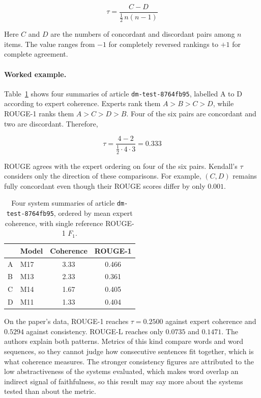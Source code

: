 \documentclass[11pt]{article}
\begin{document}
\begin{equation}
  \label{eq:tau}
  \tau = \frac{C - D}{\tfrac{1}{2}\,n(n-1)}
\end{equation}

\noindent Here $C$ and $D$ are the numbers of concordant and discordant pairs among $n$ items. The value ranges from $-1$ for completely reversed rankings to $+1$ for complete agreement.

\paragraph{Worked example.}
Table~\ref{tab:tau} shows four summaries of article \texttt{dm-test-8764fb95}, labelled A to D according to expert coherence. Experts rank them $A > B > C > D$, while ROUGE-1 ranks them $A > C > D > B$. Four of the six pairs are concordant and two are discordant. Therefore,

\[
  \tau = \frac{4 - 2}{\tfrac{1}{2} \cdot 4 \cdot 3} = 0.333
\]

\noindent ROUGE agrees with the expert ordering on four of the six pairs. Kendall's $\tau$ considers only the direction of these comparisons. For example, $(C,D)$ remains fully concordant even though their ROUGE scores differ by only $0.001$.

\begin{table}[t]
  \centering
  \begin{tabular}{llcc}
    \toprule
    & \textbf{Model} & \textbf{Coherence} & \textbf{ROUGE-1} \\
    \midrule
    A & M17 & 3.33 & 0.466 \\
    B & M13 & 2.33 & 0.361 \\
    C & M14 & 1.67 & 0.405 \\
    D & M11 & 1.33 & 0.404 \\
    \bottomrule
  \end{tabular}
  \caption{Four system summaries of article
    \texttt{dm-\allowbreak test-\allowbreak 8764fb95}, ordered by mean expert
    coherence, with single reference ROUGE-1 $F_1$.}
  \label{tab:tau}
\end{table}

On the paper's data, ROUGE-1 reaches $\tau = 0.2500$ against expert coherence and $0.5294$ against consistency. ROUGE-L reaches only $0.0735$ and $0.1471$. The authors explain both patterns. Metrics of this kind compare words and word sequences, so they cannot judge how consecutive sentences fit together, which is what coherence measures. The stronger consistency figures are attributed to the low abstractiveness of the systems evaluated, which makes word overlap an indirect signal of faithfulness, so this result may say more about the systems tested than about the metric.
\end{document}
